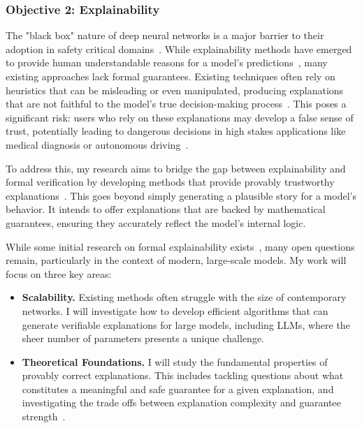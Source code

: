 \documentclass{llncs}
\begin{document}
\subsubsection{Objective 2: Explainability}
The "black box" nature of deep neural networks is a major barrier to their adoption in safety critical domains~\cite{Rudin2019StopExplaining}. 
While explainability methods have emerged to provide human understandable reasons for a model's predictions~\cite{Ribeiro2016LIME,Lundberg2017SHAP,Sundararajan2017IG}, 
many existing approaches lack formal guarantees. Existing techniques often rely on heuristics 
that can be misleading or even manipulated, producing explanations that are not faithful to the model's true decision-making process~\cite{Adebayo2018Sanity,Kindermans2017Unreliability,Ghorbani2019Fragile,Slack2020FoolingLIMESHAP}. 
This poses a significant risk: users who rely on these explanations may develop a false sense of trust, 
potentially leading to dangerous decisions in high stakes applications like medical diagnosis or autonomous driving~\cite{Rudin2019StopExplaining}.

To address this, my research aims to bridge the gap between explainability and formal verification by developing 
methods that provide provably trustworthy explanations~\cite{MarquesSilvaIgnatiev2022FormalXAI,BassanKatz2023FormalXAI,WuWuBarrett2023VeriX}.
This goes beyond simply generating a plausible story for a model's behavior. 
It intends to offer explanations that are backed by mathematical guarantees, ensuring they accurately reflect the model's internal logic.

While some initial research on formal explainability exists~\cite{Carter2019SIS,MarquesSilvaIgnatiev2022FormalXAI,BassanKatz2023FormalXAI,WuWuBarrett2023VeriX},
many open questions remain, particularly in the context of modern, 
large-scale models. My work will focus on three key areas:
\begin{itemize}
  \item \textbf{Scalability.} Existing methods often struggle with the size of contemporary networks. 
  I will investigate how to develop efficient algorithms that can generate verifiable explanations for large models, 
  including LLMs, where the sheer number of parameters presents a unique challenge. 
  \item \textbf{Theoretical Foundations.} I will study the fundamental properties of provably correct explanations. 
  This includes tackling questions about what constitutes a meaningful and safe guarantee for a given explanation, 
  and investigating the trade offs between explanation complexity and guarantee strength~\cite{MarquesSilvaIgnatiev2022FormalXAI,BassanKatz2023FormalXAI,WuWuBarrett2023VeriX}.  
\end{itemize}
\end{document}
